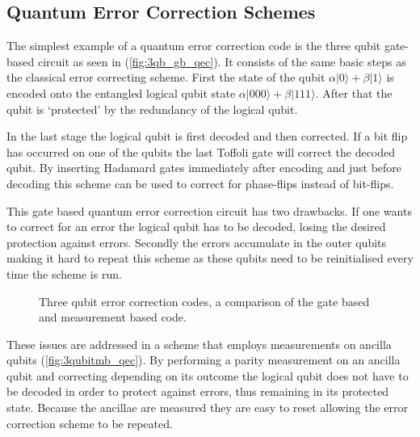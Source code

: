 \subsection{Quantum Error Correction Schemes}
\label{quantumerrorcorrectionschemes}

The simplest example of a quantum error correction code is the three qubit gate-based circuit as seen in (\autoref{fig:3qb_gb_qec}). It consists of the same basic steps as the classical error correcting scheme. First the state of the qubit  $\alpha | 0 \rangle+ \beta |1\rangle $ is encoded onto the entangled logical qubit state $ \alpha |000\rangle + \beta | 111 \rangle $. After that the qubit is `protected' by the redundancy of the logical qubit. 

In the last stage the logical qubit is first decoded and then corrected. If a bit flip has occurred on one of the qubits the last Toffoli gate will correct the decoded qubit. By inserting Hadamard gates immediately after encoding and just before decoding this scheme can be used to correct for phase-flips instead of bit-flips. 

This gate based quantum error correction circuit has two drawbacks. If one wants to correct for an error the logical qubit has to be decoded, losing the desired protection against errors. Secondly the errors accumulate in the outer qubits making it hard to repeat this scheme as these qubits need to be reinitialised every time the scheme is run.

\begin{figure}
        \centering
 \caption{Three qubit error correction codes, a comparison of the gate based and measurement based code. }\label{fig:qec_circuit}
\end{figure}


These issues are addressed in a scheme that employs measurements on ancilla qubits (\autoref{fig:3qubitmb_qec}). By performing a parity measurement on an ancilla qubit and correcting depending on its outcome the logical qubit does not have to be decoded in order to protect against errors, thus remaining in its protected state. Because the ancillae are measured they are easy to reset allowing the error correction scheme to be repeated. 

